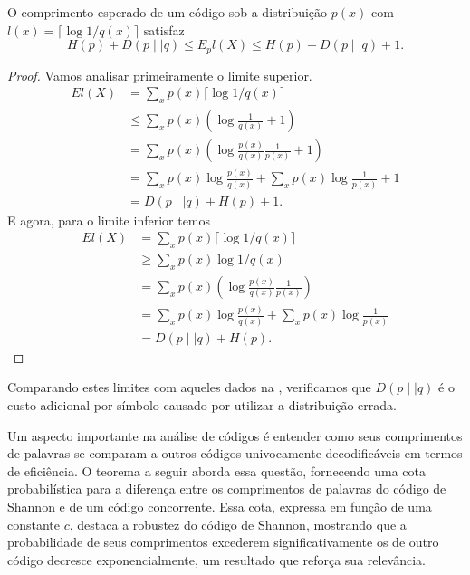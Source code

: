 \begin{theorem}
O comprimento esperado de um código sob a distribuição $p(x)$ com $l(x) = \lceil \log 1/q(x) \rceil$ satisfaz
\begin{equation}
  H(p) + D(p \mid \mid q) \leq E_p l(X) \leq H(p) + D(p \mid \mid q) + 1 .
\end{equation}
\end{theorem}
\begin{proof}
Vamos analisar primeiramente o limite superior.  
\begin{subequations}
  \begin{align}
    E l(X) &= \sum_x p(x) \lceil \log 1/q(x) \rceil \\
           &\leq \sum_x p(x) \left( \log \frac{1}{q(x)} + 1 \right) \\
           &= \sum_x p(x) \left( \log \frac{p(x)}{q(x)} \frac{1}{p(x)} + 1 \right) \\
           &= \sum_x p(x) \log \frac{p(x)}{q(x)} + \sum_x p(x) \log \frac{1}{p(x)} + 1 \\
           &= D(p \mid \mid q) + H(p) + 1 .
  \end{align}
\end{subequations}
E agora, para o limite inferior temos
\begin{subequations}
  \begin{align}
    E l(X) &= \sum_x p(x) \lceil \log 1/q(x) \rceil \\
           &\geq \sum_x p(x) \log 1/q(x) \\
           &= \sum_x p(x) \left( \log \frac{p(x)}{q(x)} \frac{1}{p(x)}\right) \\
           &= \sum_x p(x) \log \frac{p(x)}{q(x)} + \sum_x p(x) \log \frac{1}{p(x)} \\
           &= D(p \mid \mid q) + H(p) .
  \end{align}
\end{subequations}
\end{proof}
Comparando estes limites com aqueles dados na , verificamos que
$D(p \mid\mid q)$ é o custo adicional por símbolo causado por utilizar a distribuição errada.



Um aspecto importante na análise de códigos é entender como seus comprimentos
de palavras se comparam a outros códigos univocamente decodificáveis em termos
de eficiência. O teorema a seguir aborda essa questão, fornecendo uma cota
probabilística para a diferença entre os comprimentos de palavras do código de
Shannon e de um código concorrente. Essa cota, expressa em função de uma
constante $c$, destaca a robustez do código de Shannon, mostrando que a
probabilidade de seus comprimentos excederem significativamente os de outro
código decresce exponencialmente, um resultado que reforça sua relevância.


